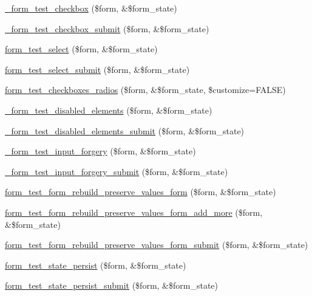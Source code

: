 \begin{DoxyCompactItemize}
\item 
\hyperlink{form__test_8module_a4c09d65c697743616b0bd80bc82d77f9}{\_\-form\_\-test\_\-checkbox} (\$form, \&\$form\_\-state)
\item 
\hyperlink{form__test_8module_a5ea5dec21c0229f6b01eb15bc60e686c}{\_\-form\_\-test\_\-checkbox\_\-submit} (\$form, \&\$form\_\-state)
\item 
\hyperlink{form__test_8module_af51824c91c240871d4499e82a97fe40e}{form\_\-test\_\-select} (\$form, \&\$form\_\-state)
\item 
\hyperlink{form__test_8module_abb8b9a150d748f82041c68da125d830f}{form\_\-test\_\-select\_\-submit} (\$form, \&\$form\_\-state)
\item 
\hyperlink{form__test_8module_a2a93627a22f1712c09b118df96838d2c}{form\_\-test\_\-checkboxes\_\-radios} (\$form, \&\$form\_\-state, \$customize=FALSE)
\item 
\hyperlink{form__test_8module_a794bd1c667316f647b595207a2291698}{\_\-form\_\-test\_\-disabled\_\-elements} (\$form, \&\$form\_\-state)
\item 
\hyperlink{form__test_8module_a8a30d2b9d8bbb078944a86e85d28ac0c}{\_\-form\_\-test\_\-disabled\_\-elements\_\-submit} (\$form, \&\$form\_\-state)
\item 
\hyperlink{form__test_8module_acd16d98f3f29567983f09d9d642bb414}{\_\-form\_\-test\_\-input\_\-forgery} (\$form, \&\$form\_\-state)
\item 
\hyperlink{form__test_8module_ac111e11abcbd435a11af8ae38f20f7d5}{\_\-form\_\-test\_\-input\_\-forgery\_\-submit} (\$form, \&\$form\_\-state)
\item 
\hyperlink{form__test_8module_a8110b3241d2e10fb9a9b650c4f2884c3}{form\_\-test\_\-form\_\-rebuild\_\-preserve\_\-values\_\-form} (\$form, \&\$form\_\-state)
\item 
\hyperlink{form__test_8module_a13c278168fe8985572df1248e0c03e51}{form\_\-test\_\-form\_\-rebuild\_\-preserve\_\-values\_\-form\_\-add\_\-more} (\$form, \&\$form\_\-state)
\item 
\hyperlink{form__test_8module_a033fef384d76554268bbf52c2098b7ed}{form\_\-test\_\-form\_\-rebuild\_\-preserve\_\-values\_\-form\_\-submit} (\$form, \&\$form\_\-state)
\item 
\hyperlink{form__test_8module_a5d7a4c512e68401d8dd332c78b078867}{form\_\-test\_\-state\_\-persist} (\$form, \&\$form\_\-state)
\item 
\hyperlink{form__test_8module_ac78096c2e799eeff109fc9f8319496f2}{form\_\-test\_\-state\_\-persist\_\-submit} (\$form, \&\$form\_\-state)

\end{DoxyCompactItemize}
